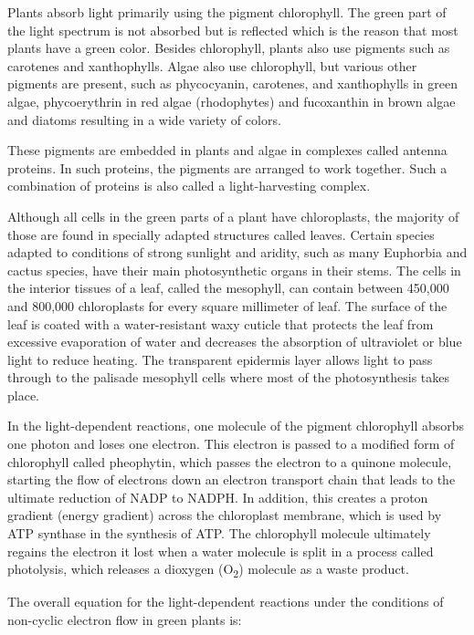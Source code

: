 Plants absorb light primarily using the pigment chlorophyll. The green part of the light spectrum is not absorbed but is reflected which is the reason that most plants have a green color. Besides chlorophyll, plants also use pigments such as carotenes and xanthophylls. Algae also use chlorophyll, but various other pigments are present, such as phycocyanin, carotenes, and xanthophylls in green algae, phycoerythrin in red algae (rhodophytes) and fucoxanthin in brown algae and diatoms resulting in a wide variety of colors.

These pigments are embedded in plants and algae in complexes called antenna proteins. In such proteins, the pigments are arranged to work together. Such a combination of proteins is also called a light-harvesting complex.

Although all cells in the green parts of a plant have chloroplasts, the majority of those are found in specially adapted structures called leaves. Certain species adapted to conditions of strong sunlight and aridity, such as many Euphorbia and cactus species, have their main photosynthetic organs in their stems. The cells in the interior tissues of a leaf, called the mesophyll, can contain between 450,000 and 800,000 chloroplasts for every square millimeter of leaf. The surface of the leaf is coated with a water-resistant waxy cuticle that protects the leaf from excessive evaporation of water and decreases the absorption of ultraviolet or blue light to reduce heating. The transparent epidermis layer allows light to pass through to the palisade mesophyll cells where most of the photosynthesis takes place.

In the light-dependent reactions, one molecule of the pigment chlorophyll absorbs one photon and loses one electron. This electron is passed to a modified form of chlorophyll called pheophytin, which passes the electron to a quinone molecule, starting the flow of electrons down an electron transport chain that leads to the ultimate reduction of NADP to NADPH. In addition, this creates a proton gradient (energy gradient) across the chloroplast membrane, which is used by ATP synthase in the synthesis of ATP. The chlorophyll molecule ultimately regains the electron it lost when a water molecule is split in a process called photolysis, which releases a dioxygen (O\textsubscript{2}) molecule as a waste product.

The overall equation for the light-dependent reactions under the conditions of non-cyclic electron flow in green plants is:

